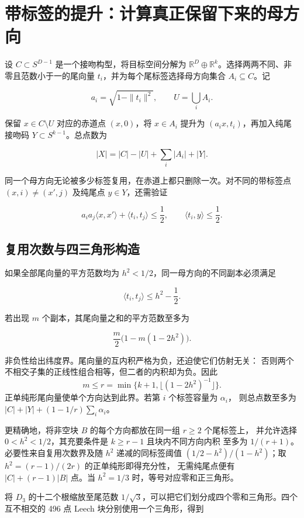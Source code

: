 \section{带标签的提升：计算真正保留下来的母方向}

设 \(C\subset S^{D-1}\) 是一个接吻构型，将目标空间分解为
\(\mathbb R^D\oplus\mathbb R^k\)。选择两两不同、非零且范数小于一的尾向量
\(t_i\)，并为每个尾标签选择母方向集合 \(A_i\subseteq C\)。记

\[
a_i=\sqrt{1-\|t_i\|^2},\qquad U=\bigcup_iA_i.
\]

保留 \(x\in C\setminus U\) 对应的赤道点 \((x,0)\)，将 \(x\in A_i\)
提升为 \((a_ix,t_i)\)，再加入纯尾接吻码 \(Y\subset S^{k-1}\)。总点数为

\[
|X|=|C|-|U|+\sum_i|A_i|+|Y|.
\]

同一个母方向无论被多少标签复用，在赤道上都只删除一次。对不同的带标签点
\((x,i)\ne(x',j)\) 及纯尾点 \(y\in Y\)，还需验证

\[
a_ia_j\langle x,x'\rangle+\langle t_i,t_j\rangle\le\frac12,
\qquad
\langle t_i,y\rangle\le\frac12.
\]

\subsection{复用次数与四三角形构造}

如果全部尾向量的平方范数均为 \(h^2<1/2\)，同一母方向的不同副本必须满足

\[
\langle t_i,t_j\rangle\le h^2-\frac12.
\]

若出现 \(m\) 个副本，其尾向量之和的平方范数至多为

\[
\frac m2\bigl(1-m(1-2h^2)\bigr).
\]

非负性给出纬度界。尾向量的互内积严格为负，还迫使它们仿射无关：
否则两个不相交子集的正线性组合相等，但二者的内积却为负。因此
\[
m\le r=\min\{k+1,\lfloor(1-2h^2)^{-1}\rfloor\}.
\]
正单纯形尾向量使单个方向达到此界。若第 $i$ 个标签容量为 $\alpha_i$，
则总点数至多为 $|C|+|Y|+(1-1/r)\sum_i\alpha_i$。

更精确地，将非空块 $B$ 的每个方向都放在同一组 $r\ge2$ 个尾标签上，
并允许选择 $0<h^2<1/2$，其充要条件是 $k\ge r-1$ 且块内不同方向内积
至多为 $1/(r+1)$。必要性来自复用次数界及随 $h^2$ 递减的同标签阈值
$(1/2-h^2)/(1-h^2)$；取 $h^2=(r-1)/(2r)$ 的正单纯形即得充分性，
无需纯尾点便有 $|C|+(r-1)|B|$ 点。当 $h^2=1/3$ 时，等号对应零和正三角形。

将 \(D_3\) 的十二个根缩放至尾范数
\(1/\sqrt3\)，可以把它们划分成四个零和三角形。四个互不相交的 496 点
Leech 块分别使用一个三角形，得到

